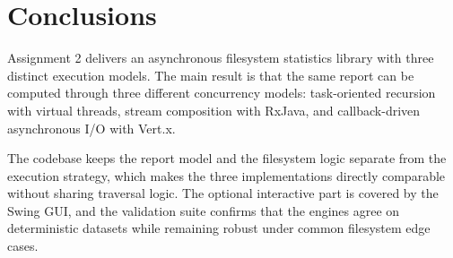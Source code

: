 \clearpage
\section{Conclusions}

Assignment 2 delivers an asynchronous filesystem statistics library with three distinct execution models.
The main result is that the same report can be computed through three different concurrency models: task-oriented recursion with virtual threads, stream composition with RxJava, and callback-driven asynchronous I/O with Vert.x.

The codebase keeps the report model and the filesystem logic separate from the execution strategy, which makes the three implementations directly comparable without sharing traversal logic.
The optional interactive part is covered by the Swing GUI, and the validation suite confirms that the engines agree on deterministic datasets while remaining robust under common filesystem edge cases.
